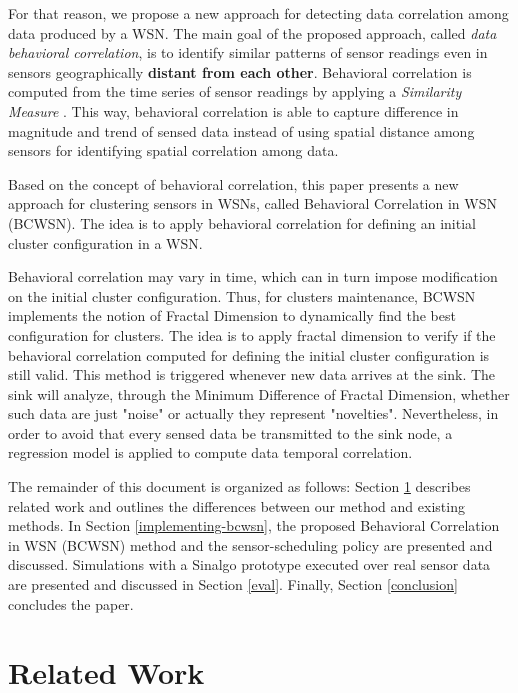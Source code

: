 \documentclass{acm_proc_article-sp}
\begin{document}
For that reason, we propose a new approach for detecting data correlation among
data produced by a WSN. The main goal of the proposed approach, called  {\it
data behavioral correlation}, is to identify similar patterns of sensor readings
even in sensors geographically \textbf{distant from each other}. Behavioral
correlation is computed from the time series of sensor readings by applying a {\it
Similarity Measure} \cite{Liu2007}. This way, behavioral correlation is able to
capture difference in magnitude and trend of sensed data instead of using
spatial distance among sensors for identifying spatial correlation among data.
\vspace*{-.3cm}

Based on the concept of behavioral correlation, this paper presents a new
approach for clustering sensors in WSNs, called Behavioral Correlation in WSN
(BCWSN). The idea is to apply behavioral correlation for defining an initial
cluster configuration in a WSN.
\vspace*{-.3cm}

Behavioral correlation may vary in time, which can in turn impose modification
on the initial cluster configuration. Thus, for clusters maintenance, BCWSN
implements the notion of Fractal Dimension to dynamically find the best
configuration for clusters. The idea is to apply fractal dimension to verify if
the behavioral correlation computed for defining the initial cluster
configuration is still valid. This method is triggered whenever new data arrives
at the sink.
The sink will analyze, through the Minimum Difference of Fractal Dimension,
whether such data are just "noise" or actually they represent "novelties". 
Nevertheless, in order to avoid that every sensed data be transmitted to the
sink node, a regression model is applied to compute data temporal correlation.
\vspace*{-.3cm}

The remainder of this document is organized as follows: Section
\ref{related-work} describes related work and outlines the differences between
our method and existing methods. In Section \ref{implementing-bcwsn}, the
proposed Behavioral Correlation in WSN (BCWSN) method and the sensor-scheduling
policy are presented and discussed. Simulations with a Sinalgo
\cite{Sinalgo2007} prototype executed over real sensor data are presented and
discussed in Section \ref{eval}. Finally, Section \ref{conclusion} concludes the
paper.


\section{Related Work}
\label{related-work}
\end{document}
